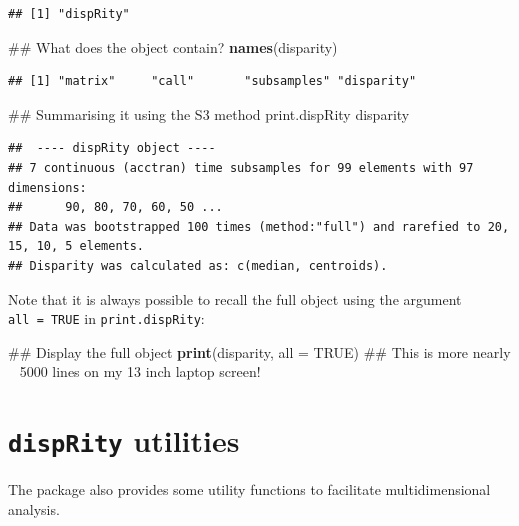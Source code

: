 \documentclass[]{book}
\newenvironment{Shaded}{\begin{snugshade}}{\end{snugshade}}
\newcommand{\KeywordTok}[1]{\textcolor[rgb]{0.13,0.29,0.53}{\textbf{#1}}}
\newcommand{\DataTypeTok}[1]{\textcolor[rgb]{0.13,0.29,0.53}{#1}}
\newcommand{\OtherTok}[1]{\textcolor[rgb]{0.56,0.35,0.01}{#1}}
\newcommand{\NormalTok}[1]{#1}
\theoremstyle{definition}
\theoremstyle{definition}
\theoremstyle{remark}
\begin{document}
\begin{verbatim}
## [1] "dispRity"
\end{verbatim}

\begin{Shaded}
\begin{Highlighting}[]
\NormalTok{## What does the object contain?}
\KeywordTok{names}\NormalTok{(disparity)}
\end{Highlighting}
\end{Shaded}

\begin{verbatim}
## [1] "matrix"     "call"       "subsamples" "disparity"
\end{verbatim}

\begin{Shaded}
\begin{Highlighting}[]
\NormalTok{## Summarising it using the S3 method print.dispRity}
\NormalTok{disparity}
\end{Highlighting}
\end{Shaded}

\begin{verbatim}
##  ---- dispRity object ---- 
## 7 continuous (acctran) time subsamples for 99 elements with 97 dimensions:
##      90, 80, 70, 60, 50 ...
## Data was bootstrapped 100 times (method:"full") and rarefied to 20, 15, 10, 5 elements.
## Disparity was calculated as: c(median, centroids).
\end{verbatim}

Note that it is always possible to recall the full object using the
argument \texttt{all\ =\ TRUE} in \texttt{print.dispRity}:

\begin{Shaded}
\begin{Highlighting}[]
\NormalTok{## Display the full object}
\KeywordTok{print}\NormalTok{(disparity, }\DataTypeTok{all =} \OtherTok{TRUE}\NormalTok{)}
\NormalTok{## This is more nearly ~ 5000 lines on my 13 inch laptop screen!}
\end{Highlighting}
\end{Shaded}

\section{\texorpdfstring{\texttt{dispRity}
utilities}{dispRity utilities}}\label{disprity-utilities}

The package also provides some utility functions to facilitate
multidimensional analysis.
\end{document}
